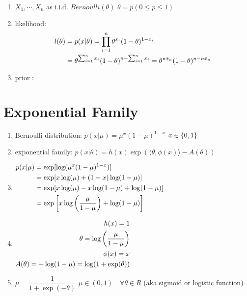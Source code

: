 \begin{enumerate}[itemsep=0.2cm]
    \item $X_1,\cdots, X_n$ as i.i.d. $Bernoulli(\theta)$ 
        \hfill
        $\theta = p (0 \leq p \leq 1)$

    \item likelihood:
    \begin{align*}
        l(\theta) 
        &= p(x|\theta)
        = \displaystyle\prod_{i=1}^n \theta^{x_i} (1 - \theta)^{1 - x_i} \\
        &= \theta^{\sum_{i=1}^n x_i} (1 - \theta)^{n - \sum_{i=1}^n x_i}
        = \theta^{n\bar{x}_n} (1 - \theta)^{n - n\bar{x}_n} \\
    \end{align*}

    \item prior : 
\end{enumerate}

\section{Exponential Family \cite{mfml-1}} \label{Bernoulli Distribution: Exponential Family}

\begin{enumerate}[itemsep=0.2cm]
    \item Bernoulli distribution: $p(x | \mu) = \mu^x(1 - \mu)^{1-x}$ \hfill $x \in \left\{0, 1\right\}$

    \item exponential family: $p(x | \theta) = h(x) \exp (\langle\theta, \phi(x)\rangle - A(\theta))$

    \item $\begin{aligned}
        p(x | \mu) 
        &= \exp[\log(\mu^x (1 - \mu)^{1-x})] \\
        &= \exp[x \log (\mu) + (1 - x) \log(1 - \mu)] \\
        &= \exp[x \log (\mu) - x \log(1 - \mu) + \log(1 - \mu)] \\
        &= \exp\left[
            x \log\left(\dfrac{\mu}{1 - \mu}\right)
            + \log(1 - \mu)
        \right]
    \end{aligned}$

    \item $\begin{aligned}
        h(x) = 1  \\
        \theta = \log\left(\dfrac{\mu}{1-\mu}\right) \\
        \phi(x) = x \\
        A(\theta) = - \log(1 - \mu) = \log(1 + \exp(\theta))\\
    \end{aligned}$

    \item $\mu = \dfrac{1}{1 + \exp(-\theta)}$ 
        \hfill 
        $\mu \in (0, 1) \quad \forall \theta \in R$
        \hfill 
        (aka sigmoid or logistic function)
    
\end{enumerate}

